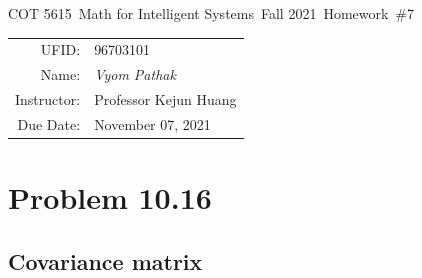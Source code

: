 \documentclass{article}
\newcommand{\hmwkTitle}{Homework\ \#7}
\newcommand{\hmwkDueDate}{November 07, 2021}
\newcommand{\hmwkClassCode}{COT 5615}
\newcommand{\hmwkClass}{Math for Intelligent Systems}
\newcommand{\hmwkClassYear}{Fall 2021}
\newcommand{\hmwkClassInstructor}{Professor Kejun Huang}
\newcommand{\hmwkAuthorName}{\textit{Vyom Pathak}}
\newcommand{\hmwkUFID}{96703101}
\begin{document}
\begin{center}
{\Large \hmwkClassCode\ \hmwkClass\ \hmwkClassYear\ \hmwkTitle}

\begin{tabular}{rl}
UFID: & \hmwkUFID \\
Name: & \hmwkAuthorName \\
Instructor: & \hmwkClassInstructor \\
Due Date: & \hmwkDueDate \\ 
\end{tabular}
\end{center}

\section*{Problem 10.16}
\subsection*{Covariance matrix}
\end{document}
